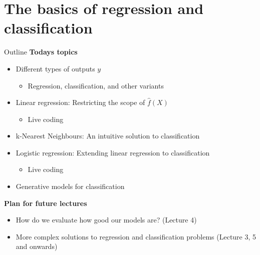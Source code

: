 \section{The basics of regression and classification}

\begin{frame}{Outline}
    \textbf{Todays topics}\\[-0.0cm]
    \begin{itemize}
        \item Different types of outputs $y$
        \begin{itemize}
            \item Regression, classification, and other variants
        \end{itemize}
        \item Linear regression: Restricting the scope of $\hat{f}(X)$
        \begin{itemize}
            \item Live coding 
        \end{itemize}
        \item k-Nearest Neighbours: An intuitive solution to classification
        \item Logistic regression: Extending linear regression to classification
        \begin{itemize}
            \item Live coding 
        \end{itemize}
        \item Generative models for classification
    \end{itemize}

    \textbf{Plan for future lectures}\\[-0.0cm]
    \begin{itemize}
        \item How do we evaluate how good our models are? (Lecture 4)
        \item More complex solutions to regression and classification problems (Lecture 3, 5 and onwards)
    \end{itemize}
\end{frame}

    \newcommand{\weightnode}[3]{
        \node[circle, draw=black, fill=teal!60, opacity=#3] at (#1, #2*3.5) {};
    }

